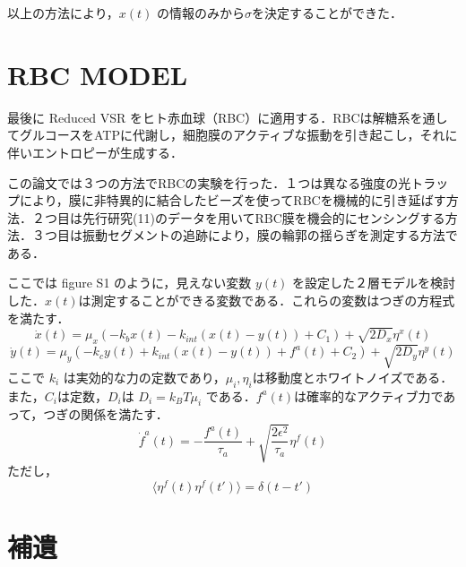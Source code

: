 \documentclass{jsarticle}
\numberwithin{equation}{section}
\theoremstyle{definition}
\newcommand{\ave}[1]{\langle #1 \rangle}
\begin{document}
以上の方法により，$x(t)$ の情報のみから$\sigma $を決定することができた．

\newpage 
\section{RBC MODEL}
最後に Reduced VSR をヒト赤血球（RBC）に適用する．RBCは解糖系を通してグルコースをATPに代謝し，細胞膜のアクティブな振動を引き起こし，それに伴いエントロピーが生成する．\par 
この論文では３つの方法でRBCの実験を行った．１つは異なる強度の光トラップにより，膜に非特異的に結合したビーズを使ってRBCを機械的に引き延ばす方法．２つ目は先行研究(11)のデータを用いてRBC膜を機会的にセンシングする方法．３つ目は振動セグメントの追跡により，膜の輪郭の揺らぎを測定する方法である．\par 
ここでは figure S1 のように，見えない変数 $y(t)$ を設定した２層モデルを検討した．$x(t)$は測定することができる変数である．これらの変数はつぎの方程式を満たす．
\begin{equation}
  \dot{x}(t) = \mu_x (-k_b x(t) - k_{int}(x(t) - y(t)) + C_1) + \sqrt{2D_x} \eta^x (t) 
\end{equation}
\begin{equation}
  \dot{y}(t) = \mu_y (-k_c y(t) + k_{int}(x(t) - y(t)) + f^a (t) + C_2) + \sqrt{2D_y} \eta^y (t) 
\end{equation}
ここで $k_{i}$ は実効的な力の定数であり，$\mu_{i}, \eta_{i}$は移動度とホワイトノイズである．また，$C_i$は定数，$D_i$は $D_i = k_B T \mu_i$ である．$f^a (t)$は確率的なアクティブ力であって，つぎの関係を満たす．
\begin{equation}
  \dot{f}^a (t) = - \frac{f^a (t)}{\tau_a} + \sqrt{\frac{2 \epsilon^2}{\tau_a}} \eta^f (t)
\end{equation}
ただし，
\begin{equation}
  \ave{\eta^f (t) \eta^f (t')} = \delta (t - t')
\end{equation}

\newpage 
\section{補遺}
\end{document}
